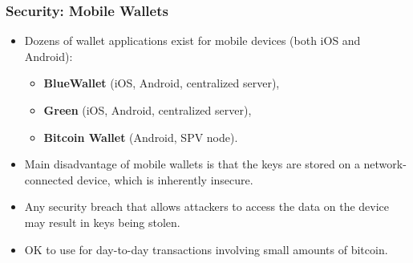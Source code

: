 \documentclass{beamer}
\begin{document}
\begin{frame}
  \frametitle{Security: Mobile Wallets}
  \begin{itemize}
  \item Dozens of wallet applications exist for mobile devices (both iOS and
    Android):
    \begin{itemize}
    \item \textbf{BlueWallet} (iOS, Android, centralized server),
    \item \textbf{Green} (iOS, Android, centralized server),
    \item \textbf{Bitcoin Wallet} (Android, SPV node).
    \end{itemize}
  \item Main disadvantage of mobile wallets is that the keys are stored on a
    network-connected device, which is inherently insecure.
  \item Any security breach that allows attackers to access the data on the
    device may result in keys being stolen.
  \item OK to use for day-to-day transactions involving small amounts of
    bitcoin.
  \end{itemize}
\end{frame}
\end{document}
